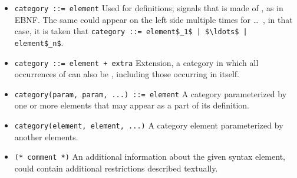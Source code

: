 \begin{itemize}
  \item \lstinline!category ::= element! \newline
    Used for definitions; signals that  is made of , as in EBNF. The same  could appear on the left side multiple times for  \ldots\ , in that case, it is taken that \lstinline!category ::= element$_1$ | $\ldots$ | element$_n$!.
  \item \lstinline!category ::= element + extra! \newline
    Extension, a category in which all occurrences of  can also be , including those occurring in  itself. 
  \item \lstinline!category(param, param, ...) ::= element! \newline
    A category parameterized by one or more elements that may appear as a part of its definition.
  \item \lstinline!category(element, element, ...)! \newline
    A category element parameterized by another elements.
  \item \lstinline!(* comment *)! \newline
    An additional information about the given syntax element, could contain additional restrictions described textually. 
\end{itemize}







